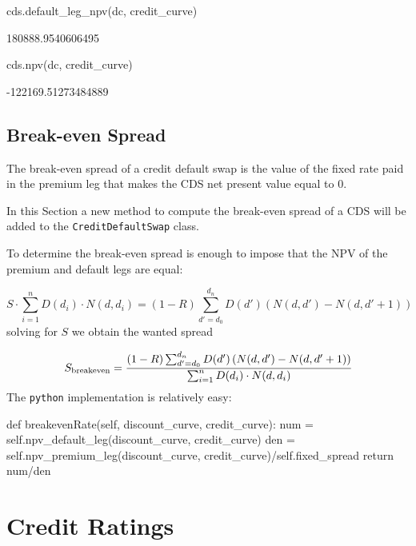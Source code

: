 \begin{ipython}
cds.default_leg_npv(dc, credit_curve)
\end{ipython}
\begin{ioutput}
180888.9540606495
\end{ioutput}

\begin{ipython}
cds.npv(dc, credit_curve)
\end{ipython}
\begin{ioutput}
-122169.51273484889
\end{ioutput}
	
\subsection{Break-even Spread}
The break-even spread of a credit default swap is the value of the fixed rate paid in the premium leg that makes the CDS net present value equal to 0.

In this Section a new method to compute the break-even spread of a CDS will be added to the \texttt{CreditDefaultSwap} class.

To determine the break-even spread is enough to impose that the NPV of the premium and default legs are equal:

\begin{equation}
S \cdot\sum_{i=1}^{n} D(d_i) \cdot N(d, d_i)
= (1-R) \sum_{d'=d_0}^{d_n} D(d') \left( N(d, d') - N(d, d'+1) \right)
\end{equation}
solving for $S$ we obtain the wanted spread

\begin{equation}
S_{\mathrm{breakeven}} = \cfrac{(1-R) \sum_{d'=d_0}^{d_n} D(d') \left( N(d, d') - N(d, d'+1) \right)}{\sum_{i=1}^{n} D(d_i) \cdot N(d, d_i)}
\end{equation}
The \texttt{python} implementation is relatively easy:

\begin{ipython}
def breakevenRate(self, discount_curve, credit_curve):
    num = self.npv_default_leg(discount_curve, credit_curve)
    den = self.npv_premium_leg(discount_curve, credit_curve)/self.fixed_spread
    return num/den
\end{ipython}

\section{Credit Ratings}\label{credit-ratings}

